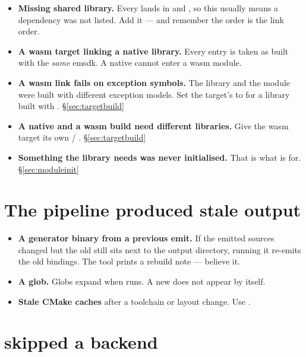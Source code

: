 \begin{itemize}
  \item \textbf{Missing shared library.} Every  
    lands in  and , so this usually
    means a dependency was not listed. Add it --- and remember the order is the
    link order.
  \item \textbf{A wasm target linking a native library.} Every 
    entry is taken as  built with the \emph{same} emsdk. A
    native  cannot enter a wasm module.
  \item \textbf{A wasm link fails on exception symbols.} The library and the
    module were built with different exception models. Set the target's
     to  for a library built with
    . \S\ref{sec:targetbuild}
  \item \textbf{A native and a wasm build need different libraries.} Give
    the wasm target its own  / .
    \S\ref{sec:targetbuild}
  \item \textbf{Something the library needs was never initialised.} That is what
     is for. \S\ref{sec:moduleinit}
\end{itemize}

\section{The pipeline produced stale output}

\begin{itemize}
  \item \textbf{A generator binary from a previous emit.} If the emitted sources
    changed but the old  still sits next to the output
    directory, running it re-emits the old bindings. The tool prints a rebuild
    note --- believe it.
  \item \textbf{A  glob.} Globs expand when
     runs. A new  does not appear by itself.
  \item \textbf{Stale CMake caches} after a toolchain or layout change. Use
    .
\end{itemize}

\section{ skipped a backend}

